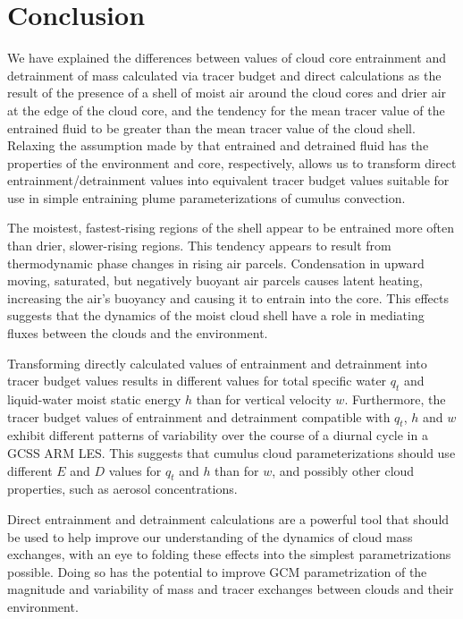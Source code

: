 \documentclass[12pt]{article}
\begin{document}

\section{Conclusion}

We have explained the differences between values of cloud core 
entrainment and detrainment of mass calculated via tracer budget and 
direct calculations as the result of the presence of a shell of moist 
air around the cloud cores and drier air at the edge of the cloud core, 
and the tendency for the mean tracer value of the entrained fluid to be 
greater than the mean tracer value of the cloud shell.  Relaxing the 
assumption made by \cite{Siebesma1995} that entrained and detrained 
fluid has the properties of the environment and core, respectively, 
allows us to transform direct entrainment/detrainment values into 
equivalent tracer budget values suitable for use in simple entraining 
plume parameterizations of cumulus convection.  

The moistest, fastest-rising regions of the shell appear to be entrained 
more often than drier, slower-rising regions.  This tendency appears to 
result from thermodynamic phase changes in rising air parcels. 
Condensation in upward moving, saturated, but negatively buoyant air 
parcels causes latent heating, increasing the air's buoyancy and causing 
it to entrain into the core.  This effects suggests that the dynamics of 
the moist cloud shell have a role in mediating fluxes between the clouds 
and the environment.

Transforming directly calculated values of entrainment and detrainment 
into tracer budget values results in different values for total specific
water $q_t$ and liquid-water moist static energy $h$ than for vertical 
velocity $w$.  Furthermore, the tracer budget values of entrainment
and detrainment compatible with $q_t$, $h$ and $w$ exhibit different 
patterns of variability over the course of a diurnal cycle in a GCSS ARM 
LES.  This suggests that cumulus cloud parameterizations should use 
different $E$ and $D$ values for $q_t$ and $h$ than for $w$, and possibly 
other cloud properties, such as aerosol concentrations.

Direct entrainment and detrainment calculations are a powerful tool 
that should be used to help improve our understanding of the dynamics of 
cloud mass exchanges, with an eye to folding these effects into the 
simplest parametrizations possible. Doing so has the potential to 
improve GCM parametrization of the magnitude and variability of mass and 
tracer exchanges between clouds and their environment.
\end{document}
